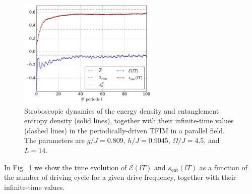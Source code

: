 \documentclass{SciPost}
\newcommand\0{\scalebox{-1}[1]{0}}
\begin{document}
\begin{figure}
	\centering
	\includegraphics[width=0.6\textwidth]{example2.pdf}
	\caption{Stroboscopic dynamics of the energy density and entanglement entropy density (solid lines), together with their infinite-time values (dashed lines) in the periodically-driven TFIM in a parallel field. The parameters are $g/J=0.809$, $h/J=0.9045$, $\Omega/J=4.5$, and $L=14$.}
	\label{fig:example2}
\end{figure}

In Fig.~\ref{fig:example2} we show the time evolution of $\mathcal{E}(lT)$ and $s_\mathrm{ent}(lT)$ as a function of the number of driving cycle for a given drive frequency, together with their infinite-time values.
\end{document}
